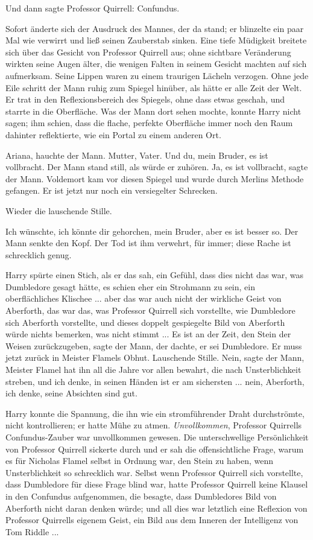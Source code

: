 Und dann sagte Professor Quirrell: \glqq{}Confundus.\grqq{}

Sofort änderte sich der Ausdruck des Mannes, der da stand; er blinzelte ein paar
Mal wie verwirrt und ließ seinen Zauberstab sinken. Eine tiefe Müdigkeit
breitete sich über das Gesicht von Professor Quirrell aus; ohne sichtbare
Veränderung wirkten seine Augen älter, die wenigen Falten in seinem Gesicht
machten auf sich aufmerksam. Seine Lippen waren zu einem traurigen Lächeln
verzogen. Ohne jede Eile schritt der Mann ruhig zum Spiegel hinüber, als hätte
er alle Zeit der Welt. Er trat in den Reflexionsbereich des Spiegels, ohne dass
etwas geschah, und starrte in die Oberfläche. Was der Mann dort sehen mochte,
konnte Harry nicht sagen; ihm schien, dass die flache, perfekte Oberfläche immer
noch den Raum dahinter reflektierte, wie ein Portal zu einem anderen Ort.

\glqq{}Ariana\grqq{}, hauchte der Mann. \glqq{}Mutter, Vater. Und du, mein Bruder,
es ist vollbracht.\grqq{} Der Mann stand still, als würde er zuhören. \glqq{}Ja,
es ist vollbracht\grqq{}, sagte der Mann. \glqq{}Voldemort kam vor diesen Spiegel
und wurde durch Merlins Methode gefangen. Er ist jetzt nur noch ein versiegelter
Schrecken.\grqq{}

Wieder die lauschende Stille.

\glqq{}Ich wünschte, ich könnte dir gehorchen, mein Bruder, aber es ist besser
so.\grqq{} Der Mann senkte den Kopf. \glqq{}Der Tod ist ihm verwehrt, für immer;
diese Rache ist schrecklich genug.\grqq{}

Harry spürte einen Stich, als er das sah, ein Gefühl, dass dies nicht das war,
was Dumbledore gesagt hätte, es schien eher ein Strohmann zu sein, ein
oberflächliches Klischee ... aber das war auch nicht der wirkliche Geist von
Aberforth, das war das, was Professor Quirrell sich vorstellte, wie Dumbledore
sich Aberforth vorstellte, und dieses doppelt gespiegelte Bild von Aberforth
würde nichts bemerken, was nicht stimmt ... \glqq{}Es ist an der Zeit, den Stein
der Weisen zurückzugeben\grqq{}, sagte der Mann, der dachte, er sei Dumbledore.
\glqq{}Er muss jetzt zurück in Meister Flamels Obhut.\grqq{} Lauschende Stille.
\glqq{}Nein\grqq{}, sagte der Mann, \glqq{}Meister Flamel hat ihn all die Jahre
vor allen bewahrt, die nach Unsterblichkeit streben, und ich denke, in seinen
Händen ist er am sichersten ... nein, Aberforth, ich denke, seine Absichten sind
gut.\grqq{}

Harry konnte die Spannung, die ihn wie ein stromführender Draht durchströmte,
nicht kontrollieren; er hatte Mühe zu atmen. \emph{Unvollkommen}, Professor
Quirrells Confundus-Zauber war unvollkommen gewesen. Die unterschwellige
Persönlichkeit von Professor Quirrell sickerte durch und er sah die
offensichtliche Frage, warum es für Nicholas Flamel selbst in Ordnung war, den
Stein zu haben, wenn Unsterblichkeit so schrecklich war. Selbst wenn Professor
Quirrell sich vorstellte, dass Dumbledore für diese Frage blind war, hatte
Professor Quirrell keine Klausel in den Confundus aufgenommen, die besagte, dass
Dumbledores Bild von Aberforth nicht daran denken würde; und all dies war
letztlich eine Reflexion von Professor Quirrells eigenem Geist, ein Bild aus dem
Inneren der Intelligenz von Tom Riddle ...

